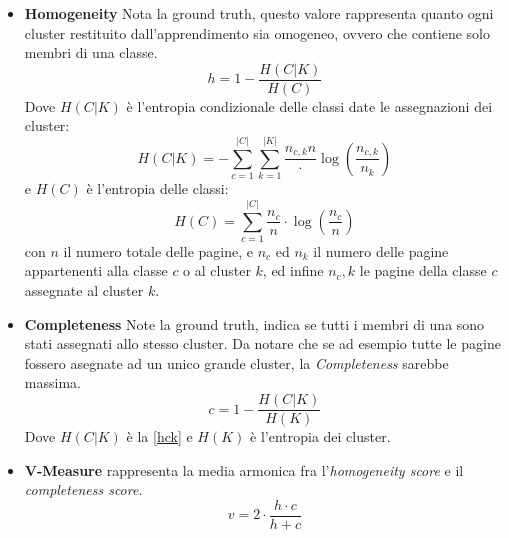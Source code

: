 \begin{itemize}
\item \textbf{Homogeneity}
Nota la ground truth, questo valore rappresenta quanto ogni cluster restituito dall'apprendimento sia omogeneo, ovvero che contiene solo membri di una classe. 
\begin{equation}
h = 1 - \frac{H(C|K)}{H(C)}
\end{equation}
Dove $H(C|K)$ è l'entropia condizionale delle classi date le assegnazioni dei cluster:
\begin{equation}
H(C|K) = - \sum\limits_{c=1}^{|C|} \sum\limits_{k=1}^{|K|} \frac{n_{c,k}{n}} \cdot \log \left( \frac{n_{c,k}}{n_k}\right)
\end{equation}
\label{hck}
e $H(C)$ è l'entropia delle classi:
\begin{equation}
H(C) = \sum\limits_{c=1}^{|C|} \frac{n_c}{n} \cdot \log \left( \frac{n_{c}}{n}\right)
\end{equation}
\label{hc}
con $n$ il numero totale delle pagine, e $n_c$ ed $n_k$ il numero delle pagine appartenenti alla classe $c$ o al cluster $k$, ed infine $n_c,k$ le pagine della classe $c$ assegnate al cluster $k$.
\item \textbf{Completeness}
Note la ground truth, indica se tutti i membri di una sono stati assegnati allo stesso cluster. Da notare che se ad esempio tutte le pagine fossero asegnate ad un unico grande cluster, la \textit{Completeness} sarebbe massima.
\begin{equation}
c = 1 - \frac{H(C|K)}{H(K)}
\end{equation}
Dove $H(C|K)$ è la \ref{hck} e $H(K)$ è l'entropia dei cluster.
\item \textbf{V-Measure} rappresenta la media armonica fra l'\textit{homogeneity score} e il \textit{completeness score}.
\begin{equation}
v = 2 \cdot \frac{h \cdot c}{h + c}
\end{equation}


\end{itemize}
